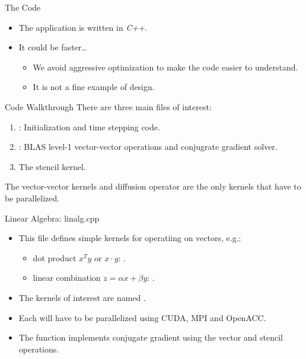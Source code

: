 \documentclass[aspectratio=43]{beamer}
\begin{document}
\begin{frame}[fragile]{The Code}
    \begin{itemize}
        \item The application is written in \emph{C++}.
        \item It could be faster\dots
        \begin{itemize}
            \item We avoid aggressive optimization to make the code easier to understand.
            \item It is not a fine example of design.
        \end{itemize}
    \end{itemize}
\end{frame}

\begin{frame}[fragile]{Code Walkthrough}
    There are three main files of interest:
    \begin{enumerate}
        \item {}: Initialization and time stepping code.
        \item {}: BLAS level-1 vector-vector operations and conjugrate gradient solver.
        \item {} The stencil kernel.
    \end{enumerate}
    The vector-vector kernels and diffusion operator  are the only kernels that have to be parallelized.
\end{frame}

\begin{frame}[fragile]{Linear Algebra: linalg.cpp}
    \begin{itemize}
        \item This file defines simple kernels for operatiing on vectors, e.g.:
        \begin{itemize}
            \item dot product $x^T y$ or $x\cdot y$: .
            \item linear combination $z=\alpha x + \beta y$: .
        \end{itemize}
        \item The kernels of interest are named .
        \item Each will have to be parallelized using CUDA, MPI and OpenACC.
        \item The  function implements conjugate gradient using the vector and stencil operations.
    \end{itemize}
\end{frame}
\end{document}
